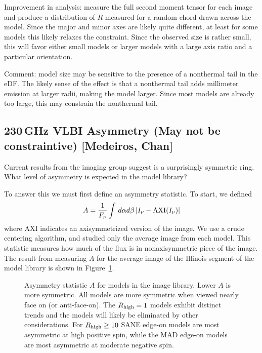 \documentclass[twocolumn,tighten,dvipsnames]{aastex63}
\begin{document}
Improvement in analysis: measure the full second moment tensor for each image and produce a distribution of $R$ measured for a random chord drawn across the model.  Since the major and minor axes are likely quite different, at least for some models \citep{2019ApJ...871...30I} this likely relaxes the constraint.  Since the observed size is rather small, this will favor either small models or larger models with a large axis ratio and a particular orientation.

Comment: model size may be sensitive to the presence of a nonthermal tail in the eDF.  The likely sense of the effect is that a nonthermal tail adds millimeter emission at larger radii, making the model larger.  Since most models are already too large, this may constrain the nonthermal tail.

\subsection{230\,GHz VLBI Asymmetry (May not be constraintive)
  [Medeiros, Chan]}
\label{sec:230asym}

Current results from the imaging group suggest \sgra is a surprisingly symmetric ring.   What level of asymmetry is expected in the model library?

To answer this we must first define an asymmetry statistic.  To start, we defined
\begin{equation}
  A = \frac{1}{F_\nu} \int \, d\alpha d\beta \, | I_\nu - {\rm AXI}(I_\nu) |
\end{equation}
where AXI indicates an axisymmetrized version of the image.  We use a crude centering algorithm, and studied only the average image from each model.  This statistic measures how much of the flux is in nonaxisymmetric piece of the image.   The result from measuring $A$ for the average image of the Illinois segment of the \sgra model library is shown in Figure~\ref{fig:asymm}.

\begin{figure*}
  \caption{Asymmetry statistic $A$ for models in the \sgra image library.  Lower $A$ is more symmetric.  All models are more symmetric when viewed nearly face on (or anti-face-on).  The ${R_\mathrm{high}} = 1$ models exhibit distinct trends and the models will likely be eliminated by other considerations.  For ${R_\mathrm{high}} \ge 10$ SANE edge-on models are most asymmetric at high positive spin, while the MAD edge-on models are most asymmetric at moderate negative spin.}
  \label{fig:asymm}
\end{figure*}
\end{document}
